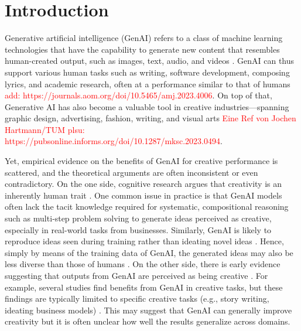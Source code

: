 \documentclass[manuscript, screen, review, acmsmall, anonymous]{acmart}
\newcommand{\TODO}[1]{\textcolor{red}{#1}}
\begin{document}
\section{Introduction}
\label{sec:Introduction}


Generative artificial intelligence (GenAI) refers to a class of machine learning technologies that have the capability to generate new content that resembles human-created output, such as images, text, audio, and videos  \cite{FeuerriegelBISE2024}. GenAI can thus support various human tasks such as writing, software development, composing lyrics, and academic research, often at a performance similar to that of humans \TODO{add: https://journals.aom.org/doi/10.5465/amj.2023.4006}\cite{Herbold2023, Cui2025, 10.1093/pnasnexus/pgae052, Ruksakulpiwat2024, brynjolfsson2024generativeaiwork}. On top of that, Generative AI has also become a valuable tool in creative industries---spanning graphic design, advertising, fashion, writing, and visual arts  \TODO{Eine Ref von Jochen Hartmann/TUM
plsu: https://pubsonline.informs.org/doi/10.1287/mksc.2023.0494}\cite{Sun_2024}. 

Yet, empirical evidence on the benefits of GenAI for creative performance is scattered, and the theoretical arguments are often inconsistent or even contradictory. On the one side, cognitive research argues that creativity is an inherently human trait \cite{aru2024artificialintelligenceinternalprocesses,sæbø2024stochasticshumanartificialcreativity}. One common issue in practice is that GenAI models often lack the tacit knowledge required for systematic, compositional reasoning such as multi‐step problem solving to generate ideas perceived as creative, especially in real-world tasks from businesses. Similarly, GenAI is likely to reproduce ideas seen during training rather than ideating novel ideas \cite{ismayilzada2024creativityaiprogresseschallenges}. Hence, simply by means of the training data of GenAI, the generated ideas may also be less diverse than those of humans \cite{doi:10.1126/sciadv.adn5290}. On the other side, there is early evidence suggesting that outputs from GenAI are perceived as being creative \cite{wang2024aicreativehumans}. For example, several studies find benefits from GenAI in creative tasks, but these findings are typically limited to specific creative tasks (e.g., story writing, ideating business models) \cite{doi:10.1126/sciadv.adn5290, Lee2024, Zhou2024, Wadinambiarachchi_2024}. This may suggest that GenAI can generally improve creativity but it is often unclear how well the results generalize across domains.  
\end{document}
